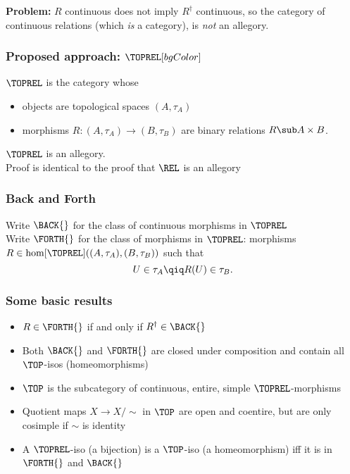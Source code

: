 {\begin{frame}
        \vspace{1cm}

        \textbf{Problem:} $R$ continuous does not imply $R^{\dagger}$ continuous, so the category of continuous relations (which \textit{is} a category), is \textit{not} an allegory.
    \end{frame}

    \begin{frame}
        \frametitle{Proposed approach: $\TOPREL[bgColor]$}
         $\TOPREL$ is the category whose
        \begin{itemize}
            \item objects are topological spaces $(A,\tau_A)$\pause
            \item morphisms $R:(A,\tau_A)\to (B,\tau_B)$ are binary relations $R\sub A\times B$. 
        \end{itemize}

        \vspace{1cm}

         $\TOPREL$ is an allegory.\\\pause
        \indent Proof is identical to the proof that $\REL$ is an allegory
    \end{frame}

    \begin{frame}
        \frametitle{Back and Forth}
         Write $\BACK{}$ for the class of continuous morphisms in $\TOPREL$\\ \pause
         Write $\FORTH{}$ for the class of  morphisms in $\TOPREL$: morphisms $R\in\hom[\TOPREL]((A,\tau_A),(B,\tau_B))$ such that
            \[ U\in\tau_A \qiq R(U)\in\tau_B. \]
    \end{frame}

    \begin{frame}
        \frametitle{Some basic results}
        \begin{itemize}
            \item $R\in\FORTH{}$ if and only if $R^{\dagger}\in\BACK{}$\pause
            \item Both $\BACK{}$ and $\FORTH{}$ are closed under composition and contain all $\TOP$-isos (homeomorphisms)\pause
            \item $\TOP$ is the subcategory of continuous, entire, simple $\TOPREL$-morphisms\pause
            \item Quotient maps $X\to X/\sim$ in $\TOP$ are open and coentire, but are only cosimple if $\sim$ is identity\pause
            \item A $\TOPREL$-iso (a bijection) is a $\TOP$-iso (a homeomorphism) iff it is in $\FORTH{}$ and $\BACK{}$
        \end{itemize}
    \end{frame}

}
